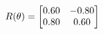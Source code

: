 \documentclass[preview]{standalone}
\begin{document}
\begin{align*}
\special{dvisvgm:raw <g id='unique000'>}R(\theta) = \begin{bmatrix}0.60 & -0.80\\0.80 & 0.60\end{bmatrix}\special{dvisvgm:raw </g>}
\end{align*}
\end{document}
